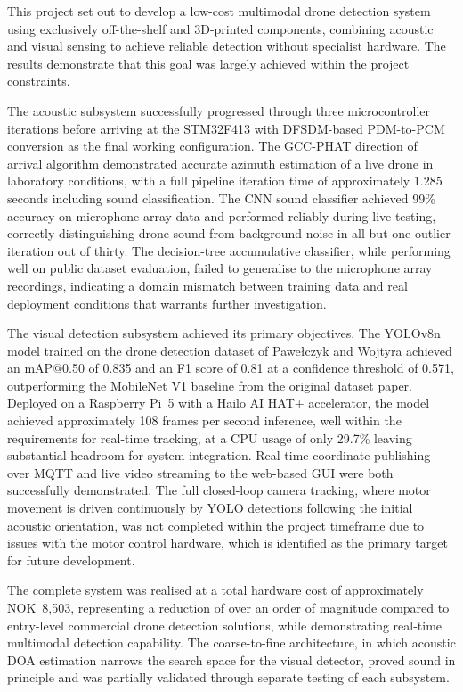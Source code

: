 This project set out to develop a low-cost multimodal drone detection 
system using exclusively off-the-shelf and 3D-printed components, 
combining acoustic and visual sensing to achieve reliable detection 
without specialist hardware. The results demonstrate that this goal 
was largely achieved within the project constraints.

The acoustic subsystem successfully progressed through three 
microcontroller iterations before arriving at the STM32F413 with 
DFSDM-based PDM-to-PCM conversion as the final working 
configuration. The GCC-PHAT direction of arrival algorithm 
demonstrated accurate azimuth estimation of a live drone in 
laboratory conditions, with a full pipeline iteration time of 
approximately 1.285 seconds including sound classification. 
The CNN sound classifier achieved 99\% accuracy on microphone 
array data and performed reliably during live testing, correctly 
distinguishing drone sound from background noise in all but one 
outlier iteration out of thirty. The decision-tree accumulative 
classifier, while performing well on public dataset evaluation, 
failed to generalise to the microphone array recordings, indicating 
a domain mismatch between training data and real deployment 
conditions that warrants further investigation.

The visual detection subsystem achieved its primary objectives. 
The YOLOv8n model trained on the drone detection dataset of 
Pawełczyk and Wojtyra achieved an mAP@0.50 of 0.835 and an F1 
score of 0.81 at a confidence threshold of 0.571, outperforming 
the MobileNet V1 baseline from the original dataset paper. 
Deployed on a Raspberry Pi~5 with a Hailo AI HAT+ accelerator, 
the model achieved approximately 108 frames per second inference, 
well within the requirements for real-time tracking, at a CPU 
usage of only 29.7\% leaving substantial headroom for system 
integration. Real-time coordinate publishing over MQTT and live 
video streaming to the web-based GUI were both successfully 
demonstrated. The full closed-loop camera tracking, where motor 
movement is driven continuously by YOLO detections following the 
initial acoustic orientation, was not completed within the project 
timeframe due to issues with the motor control hardware, which 
is identified as the primary target for future development.

The complete system was realised at a total hardware cost of 
approximately NOK~8,503, representing a reduction of over an order 
of magnitude compared to entry-level commercial drone detection 
solutions, while demonstrating real-time multimodal detection 
capability. The coarse-to-fine architecture, in which acoustic 
DOA estimation narrows the search space for the visual detector, 
proved sound in principle and was partially validated through 
separate testing of each subsystem.

